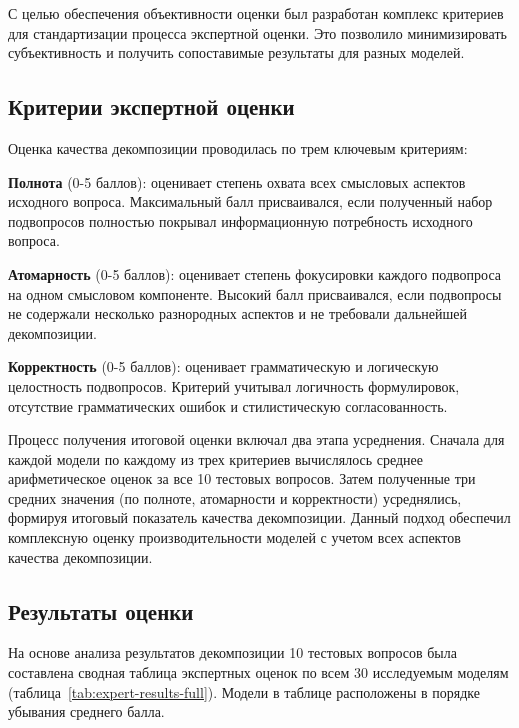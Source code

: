 С целью обеспечения объективности оценки был разработан комплекс критериев для стандартизации процесса экспертной оценки. Это позволило минимизировать субъективность и получить сопоставимые результаты для разных моделей.

\subsection{Критерии экспертной оценки}
Оценка качества декомпозиции проводилась по трем ключевым критериям:

\textbf{Полнота} (0-5 баллов): оценивает степень охвата всех смысловых аспектов исходного вопроса. Максимальный балл присваивался, если полученный набор подвопросов полностью покрывал информационную потребность исходного вопроса.

\textbf{Атомарность} (0-5 баллов): оценивает степень фокусировки каждого подвопроса на одном смысловом компоненте. Высокий балл присваивался, если подвопросы не содержали несколько разнородных аспектов и не требовали дальнейшей декомпозиции.

\textbf{Корректность} (0-5 баллов): оценивает грамматическую и логическую целостность подвопросов. Критерий учитывал логичность формулировок, отсутствие грамматических ошибок и стилистическую согласованность.

Процесс получения итоговой оценки включал два этапа усреднения. Сначала для каждой модели по каждому из трех критериев вычислялось среднее арифметическое оценок за все 10 тестовых вопросов. Затем полученные три средних значения (по полноте, атомарности и корректности) усреднялись, формируя итоговый показатель качества декомпозиции. Данный подход обеспечил комплексную оценку производительности моделей с учетом всех аспектов качества декомпозиции.

\subsection{Результаты оценки}
На основе анализа результатов декомпозиции 10 тестовых вопросов была составлена сводная таблица экспертных оценок по всем 30 исследуемым моделям (таблица~\ref{tab:expert-results-full}). Модели в таблице расположены в порядке убывания среднего балла.

